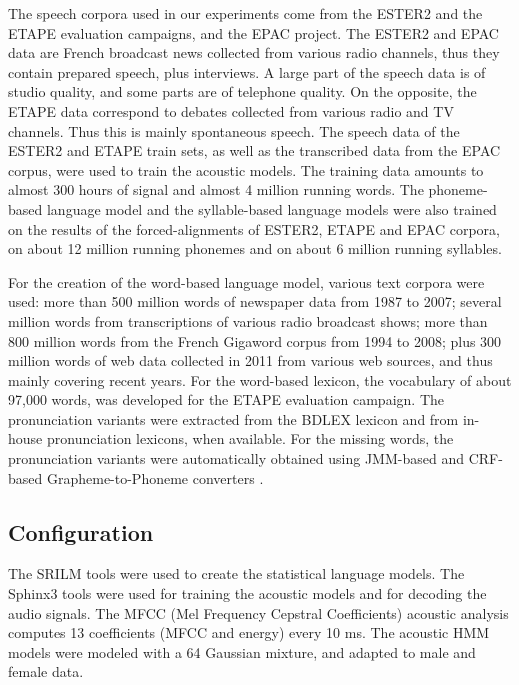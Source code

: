 \documentclass[runningheads,a4paper]{llncs}
\begin{document}
The speech corpora used in our experiments come from the ESTER2 \cite{TSD16}
and the ETAPE \cite{TSD17} evaluation campaigns, and the EPAC \cite{TSD18}
project. The ESTER2 and EPAC data are French broadcast news collected
from various radio channels, thus they contain prepared speech, plus
interviews. A large part of the speech data is of studio quality,
and some parts are of telephone quality. On the opposite, the ETAPE
data correspond to debates collected from various radio and TV channels.
Thus this is mainly spontaneous speech. The speech data of the ESTER2
and ETAPE train sets, as well as the transcribed data from the EPAC
corpus, were used to train the acoustic models. The training data
amounts to almost 300 hours of signal and almost 4 million running
words. The phoneme-based language model and the syllable-based language
models were also trained on the results of the forced-alignments of ESTER2, 
ETAPE and EPAC corpora, on about 12 million running phonemes and on about 6 million running
syllables. 

For the creation of the word-based language model, various text corpora
were used: more than 500 million words of newspaper data from 1987
to 2007; several million words from transcriptions of various radio
broadcast shows; more than 800 million words from the French Gigaword
corpus \cite{TSD19} from 1994 to 2008; plus 300 million words of
web data collected in 2011 from various web sources, and thus mainly
covering recent years. For the word-based lexicon, the vocabulary
of about 97,000 words, was developed for the ETAPE evaluation campaign.
The pronunciation variants were extracted from the BDLEX lexicon \cite{TSD20}
and from in-house pronunciation lexicons, when available. For the
missing words, the pronunciation variants were automatically obtained
using JMM-based and CRF-based Grapheme-to-Phoneme converters \cite{TSD21}.


\subsection{Configuration}

The SRILM tools \cite{TSD22} were used to create the statistical
language models. The Sphinx3 tools \cite{TSD23} were used for training the acoustic models and for decoding the audio signals. The MFCC (Mel Frequency Cepstral Coefficients) acoustic
analysis computes 13 coefficients (MFCC and energy) every 10 ms. The acoustic HMM models were modeled with a 64 Gaussian mixture, and adapted to male and female data.
\end{document}
